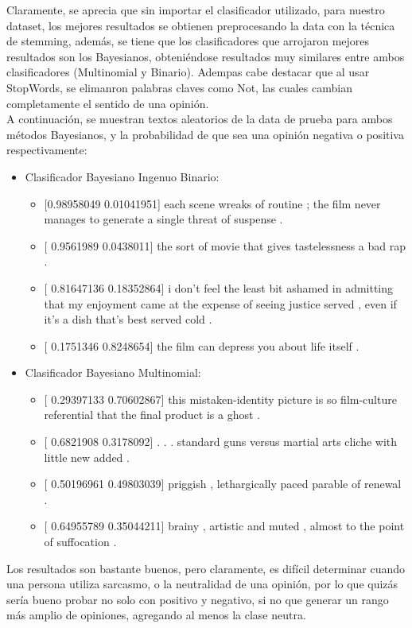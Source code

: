 \documentclass[letter, 10pt]{article}
\begin{document}
Claramente, se aprecia que sin importar el clasificador utilizado, para nuestro dataset, los mejores resultados se obtienen preprocesando la data con la técnica de stemming, además, se tiene que los clasificadores que arrojaron mejores resultados son los Bayesianos, obteniéndose resultados muy similares entre ambos clasificadores (Multinomial y Binario). Adempas cabe destacar que al usar StopWords, se elimanron palabras claves como Not, las cuales cambian completamente el sentido de una opinión. \\
A continuación, se muestran textos aleatorios de la data de prueba para ambos métodos Bayesianos, y la probabilidad de que sea una opinión negativa o positiva respectivamente:\\
\begin{itemize}
  \item Clasificador Bayesiano Ingenuo Binario:
  \begin{itemize}
    \item  {[0.98958049  0.01041951]} each scene wreaks of routine ; the film never manages to generate a single threat of suspense .
    \item {[ 0.9561989  0.0438011]} the sort of movie that gives tastelessness a bad rap .
    \item {[ 0.81647136  0.18352864]} i don't feel the least bit ashamed in admitting that my enjoyment came at the expense of seeing justice served , even if it's a dish that's best served cold .
    \item {[ 0.1751346  0.8248654]} the film can depress you about life itself .
  \end{itemize}
  \item Clasificador Bayesiano Multinomial:
  \begin{itemize}
    \item {[ 0.29397133  0.70602867]} this mistaken-identity picture is so film-culture referential that the final product is a ghost .
    \item {[ 0.6821908  0.3178092]} . . . standard guns versus martial arts cliche with little new added .
    \item {[ 0.50196961  0.49803039]} priggish , lethargically paced parable of renewal .
    \item {[ 0.64955789  0.35044211]} brainy , artistic and muted , almost to the point of suffocation .
  \end{itemize}


\end{itemize}


Los resultados son bastante buenos, pero claramente, es difícil determinar cuando una persona utiliza sarcasmo, o la neutralidad de una opinión, por lo que quizás sería bueno probar no solo con positivo y negativo, si no que generar un rango más amplio de opiniones, agregando al menos la clase neutra. 



\end{document}
